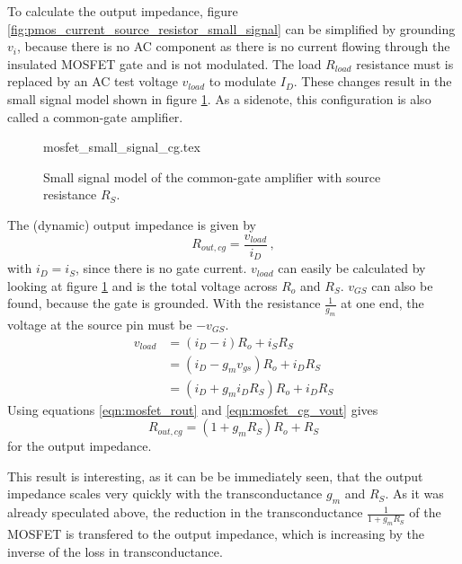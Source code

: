 To calculate the output impedance, figure \ref{fig:pmos_current_source_resistor_small_signal} can be simplified by grounding $v_i$, because there is no AC component as there is no current flowing through the insulated MOSFET gate and is not modulated. The load $R_{load}$ resistance must is replaced by an AC test voltage $v_{load}$ to modulate $I_D$. These changes result in the small signal model shown in figure \ref{fig:pmos_common_gate_amplifier}. As a sidenote, this configuration is also called a common-gate amplifier.

\begin{figure}[ht]
    \centering
    {mosfet_small_signal_cg.tex}
    \caption{Small signal model of the common-gate amplifier with source resistance $R_S$.}
    \label{fig:pmos_common_gate_amplifier}
\end{figure}

The (dynamic) output impedance is given by
\begin{equation}
    R_{out,cg} = \frac{v_{load}}{i_D}\,, \label{eqn:mosfet_rout}
\end{equation}
with $i_D = i_S$, since there is no gate current. $v_{load}$ can easily be calculated by looking at figure \ref{fig:pmos_common_gate_amplifier} and is the total voltage across $R_o$ and $R_S$. $v_{GS}$ can also be found, because the gate is grounded. With the resistance $\frac{1}{g_m}$ at one end, the voltage at the source pin must be $-v_{GS}$.
\begin{align}
    v_{load} &= \left(i_D - i\right) R_o + i_S R_S \nonumber\\
    &= \left(i_D - g_m v_{gs}\right) R_o + i_D R_S \nonumber\\
    &= \left(i_D + g_m i_D R_S\right) R_o + i_D R_S \label{eqn:mosfet_cg_vout}
\end{align}
Using equations \ref{eqn:mosfet_rout} and \ref{eqn:mosfet_cg_vout} gives
\begin{equation}
    R_{out,cg} = \left(1 + g_m R_S\right) R_o + R_S \label{eqn:mosfet_cg_rout}
\end{equation}
for the output impedance.

This result is interesting, as it can be be immediately seen, that the output impedance scales very quickly with the transconductance $g_m$ and $R_S$. As it was already speculated above, the reduction in the transconductance $\frac{1}{1 + g_m R_S}$ of the MOSFET is transfered to the output impedance, which is increasing by the inverse of the loss in transconductance.

